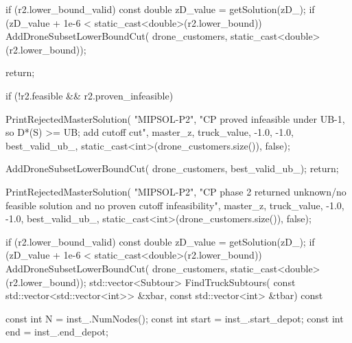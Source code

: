 {{{{{                    if (r2.lower_bound_valid)
                    {
                        const double zD_value = getSolution(zD_);
                        if (zD_value + 1e-6 < static_cast<double>(r2.lower_bound))
                        {
                            AddDroneSubsetLowerBoundCut(
                                drone_customers,
                                static_cast<double>(r2.lower_bound));
                        }
                    }

                    return;
                }

                if (!r2.feasible && r2.proven_infeasible)
                {
                    PrintRejectedMasterSolution(
                        "MIPSOL-P2",
                        "CP proved infeasible under UB-1, so D*(S) >= UB; add cutoff cut",
                        master_z,
                        truck_value,
                        -1.0,
                        -1.0,
                        best_valid_ub_,
                        static_cast<int>(drone_customers.size()),
                        false);

                    AddDroneSubsetLowerBoundCut(
                        drone_customers,
                        best_valid_ub_);
                    return;
                }

                PrintRejectedMasterSolution(
                    "MIPSOL-P2",
                    "CP phase 2 returned unknown/no feasible solution and no proven cutoff infeasibility",
                    master_z,
                    truck_value,
                    -1.0,
                    -1.0,
                    best_valid_ub_,
                    static_cast<int>(drone_customers.size()),
                    false);

                if (r2.lower_bound_valid)
                {
                    const double zD_value = getSolution(zD_);
                    if (zD_value + 1e-6 < static_cast<double>(r2.lower_bound))
                    {
                        AddDroneSubsetLowerBoundCut(
                            drone_customers,
                            static_cast<double>(r2.lower_bound));
                    }
                }
                std::vector<Subtour> FindTruckSubtours(
                    const std::vector<std::vector<int>> &xbar,
                    const std::vector<int> &tbar) const
                {
                    const int N = inst_.NumNodes();
                    const int start = inst_.start_depot;
                    const int end = inst_.end_depot;

}}}}}
